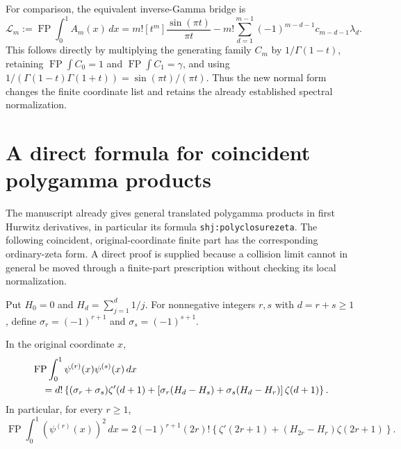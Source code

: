 For comparison, the equivalent inverse-Gamma bridge is
\begin{equation}\label{dq:inheritedAbridge}
 \mathcal L_m:=\operatorname{FP}\int_0^1 A_m(x)\,dx
 =m![t^m]\frac{\sin(\pi t)}{\pi t}
  -m!\sum_{d=1}^{m-1}(-1)^{m-d-1}c_{m-d-1}\lambda_d.
\end{equation}
This follows directly by multiplying the generating family $C_m$
by $1/\Gamma(1-t)$, retaining
$\operatorname{FP}\int C_0=1$ and
$\operatorname{FP}\int C_1=\gamma$, and using
$1/(\Gamma(1-t)\Gamma(1+t))=\sin(\pi t)/(\pi t)$.
Thus the new normal form changes the finite coordinate list and
retains the already established spectral normalization.

\section{A direct formula for coincident polygamma products}
\label{dq:bilinearsection}

The manuscript already gives general translated polygamma products
in first Hurwitz derivatives, in particular its formula
\texttt{shj:polyclosurezeta}. The following coincident, original-coordinate
finite part has the corresponding ordinary-zeta form. A direct proof
is supplied because a collision limit cannot in general be moved through
a finite-part prescription without checking its local normalization.

Put $H_0=0$ and $H_d=\sum_{j=1}^d1/j$.
For nonnegative integers $r,s$ with $d=r+s\ge1$, define
$\sigma_r=(-1)^{r+1}$ and $\sigma_s=(-1)^{s+1}$.

\begin{theorem}
\label{dq:bilinear}
In the original coordinate $x$,
\begin{align}
 &\operatorname{FP}\int_0^1\psi^{(r)}(x)\psi^{(s)}(x)\,dx\notag\\
 &\quad=d!\left\{(\sigma_r+\sigma_s)\zeta'(d+1)
 +\left[\sigma_r(H_d-H_s)+\sigma_s(H_d-H_r)\right]
                                      \zeta(d+1)\right\}.
 \label{dq:bilinearformula}
\end{align}
In particular, for every $r\ge1$,
\begin{equation}\label{dq:squareformula}
 \operatorname{FP}\int_0^1(\psi^{(r)}(x))^2\,dx
 =2(-1)^{r+1}(2r)!
    \left\{\zeta'(2r+1)+(H_{2r}-H_r)\zeta(2r+1)\right\}.
\end{equation}
\end{theorem}


